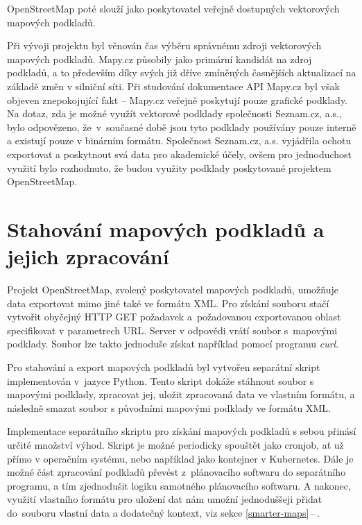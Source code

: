 \documentclass[czech, bachelor]{diploma}
\newcommand{\filipref}[1]{\ref{#1}\,--\,\nameref{#1}}
\begin{document}
OpenStreetMap poté slouží jako poskytovatel veřejně dostupných vektorových mapových podkladů.

Při vývoji projektu byl věnován čas výběru správnému zdroji vektorových mapových podkladů. Mapy.cz působily jako primární kandidát
na zdroj podkladů, a to především díky svých již dříve zmíněných časnějších aktualizací na základě změn v silniční síti.
Při studování dokumentace API Mapy.cz byl však objeven znepokojující fakt -- Mapy.cz veřejně poskytují pouze grafické podklady.
Na dotaz, zda je možné využít vektorové podklady společnosti Seznam.cz, a.s., bylo odpovězeno, že~v~současné době jsou tyto
podklady používány pouze interně a existují pouze v binárním formátu. Společnost Seznam.cz, a.s. vyjádřila ochotu exportovat
a poskytnout svá data pro akademické účely, ovšem pro jednoduchost využití bylo rozhodnuto, že budou využity podklady poskytované
projektem OpenStreetMap.

\section{Stahování mapových podkladů a jejich zpracování}

Projekt OpenStreetMap, zvolený poskytovatel mapových podkladů, umožňuje data exportovat mimo jiné také ve formátu XML. Pro získání
souboru stačí vytvořit obyčejný HTTP GET požadavek a~požadovanou exportovanou oblast specifikovat v parametrech URL. Server
v odpovědi vrátí soubor s~mapovými podklady. Soubor lze takto jednoduše získat například pomocí programu \emph{curl}.

Pro stahování a export mapových podkladů byl vytvořen separátní skript implementován v~jazyce Python. Tento skript dokáže stáhnout
soubor s mapovými podklady, zpracovat jej, uložit zpracovaná data ve vlastním formátu, a následně smazat soubor s původními
mapovými podklady ve formátu XML.

Implementace separátního skriptu pro získání mapových podkladů s sebou přinásí určité množství výhod. Skript je možné periodicky
spouštět jako cronjob, ať už přímo v operačním systému, nebo například jako kontejner v Kubernetes. Dále je možné část zpracování
podkladů převést z~plánovacího softwaru do separátního programu, a tím zjednodušit logiku samotného plánovacího softwaru.
A nakonec, využití vlastního formátu pro uložení dat nám umožní jednoduššeji přidat do~souboru vlastní data a dodatečný kontext,
viz sekce \filipref{smarter-maps}.
\end{document}
